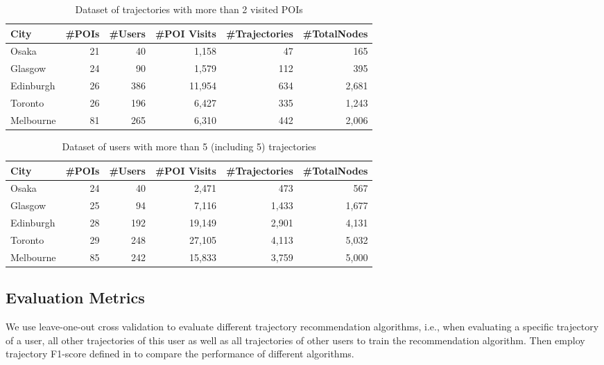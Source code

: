 \begin{table*}
\centering
\caption{Dataset of trajectories with more than 2 visited POIs}
\label{table:data:noshort}
\begin{tabular}{lrrrrr} \hline
\textbf{City} & \textbf{\#POIs} & \textbf{\#Users} & \textbf{\#POI Visits} & \textbf{\#Trajectories} & \textbf{\#TotalNodes} \\ \hline
Osaka & 21 & 40 & 1,158 & 47 & 165 \\ 
Glasgow & 24 & 90 & 1,579 & 112 & 395 \\ 
Edinburgh & 26 & 386 & 11,954 & 634 & 2,681 \\ 
Toronto & 26 & 196 & 6,427 & 335 & 1,243 \\ 
Melbourne & 81 & 265 & 6,310 & 442 & 2,006 \\ 
\hline
\end{tabular}
\end{table*}

\begin{table*}
\centering
\caption{Dataset of users with more than 5 (including 5) trajectories}
\label{table:data:nofew}
\begin{tabular}{lrrrrr} \hline
\textbf{City} & \textbf{\#POIs} & \textbf{\#Users} & \textbf{\#POI Visits} & \textbf{\#Trajectories} & \textbf{\#TotalNodes} \\ \hline
Osaka & 24 & 40 & 2,471 & 473 & 567 \\ 
Glasgow & 25 & 94 & 7,116 & 1,433 & 1,677 \\ 
Edinburgh & 28 & 192 & 19,149 & 2,901 & 4,131 \\ 
Toronto & 29 & 248 & 27,105 & 4,113 & 5,032 \\ 
Melbourne & 85 & 242 & 15,833 & 3,759 & 5,000 \\ 
\hline
\end{tabular}
\end{table*}



\subsection{Evaluation Metrics}
\label{experiment:metric}
We use leave-one-out cross validation to evaluate different trajectory recommendation algorithms,
i.e., when evaluating a specific trajectory of a user, all other trajectories of this user as well as 
all trajectories of other users to train the recommendation algorithm.
Then employ trajectory F1-score defined in \cite{ijcai15} to compare the performance of different algorithms.


